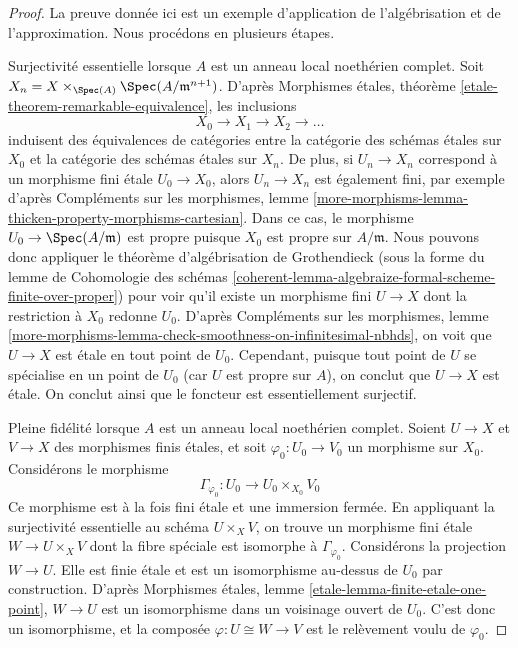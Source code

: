 \begin{proof}
La preuve donnée ici est un exemple d'application de l'algébrisation et de
l'approximation. Nous procédons en plusieurs étapes.

\medskip\noindent
Surjectivité essentielle lorsque $A$ est un anneau local noethérien complet.
Soit $X_n = X \times_{\Spec(A)} \Spec(A/\mathfrak m^{n + 1})$.
D'après Morphismes étales, théorème \ref{etale-theorem-remarkable-equivalence},
les inclusions
$$
X_0 \to X_1 \to X_2 \to \ldots
$$
induisent des équivalences de catégories entre la catégorie
des schémas étales sur $X_0$ et la catégorie des schémas
étales sur $X_n$.
De plus, si $U_n \to X_n$ correspond à un morphisme fini étale
$U_0 \to X_0$, alors $U_n \to X_n$ est également fini, par exemple
d'après Compléments sur les morphismes, lemme
\ref{more-morphisms-lemma-thicken-property-morphisms-cartesian}.
Dans ce cas, le morphisme $U_0 \to \Spec(A/\mathfrak m)$
est propre puisque $X_0$ est propre sur $A/\mathfrak m$. Nous pouvons donc appliquer
le théorème d'algébrisation de Grothendieck
(sous la forme du
lemme de Cohomologie des schémas
\ref{coherent-lemma-algebraize-formal-scheme-finite-over-proper})
pour voir qu'il existe un morphisme fini $U \to X$ dont la restriction
à $X_0$ redonne $U_0$. D'après Compléments sur les morphismes, lemme
\ref{more-morphisms-lemma-check-smoothness-on-infinitesimal-nbhds},
on voit que $U \to X$ est étale en tout point de $U_0$.
Cependant, puisque tout point de $U$ se spécialise en un point de $U_0$
(car $U$ est propre sur $A$), on conclut que $U \to X$ est étale.
On conclut ainsi que le foncteur est essentiellement surjectif.

\medskip\noindent
Pleine fidélité lorsque $A$ est un anneau local noethérien complet.
Soient $U \to X$ et $V \to X$ des morphismes finis étales, et
soit $\varphi_0 : U_0 \to V_0$ un morphisme sur $X_0$. Considérons
le morphisme
$$
\Gamma_{\varphi_0} : U_0 \longrightarrow U_0 \times_{X_0} V_0
$$
Ce morphisme est à la fois fini étale et une immersion fermée.
En appliquant la surjectivité essentielle au schéma $U \times_X V$, on trouve
un morphisme fini étale $W \to U \times_X V$ dont la fibre spéciale
est isomorphe à $\Gamma_{\varphi_0}$. Considérons la projection
$W \to U$. Elle est finie étale et est un isomorphisme au-dessus de $U_0$ par
construction. D'après Morphismes étales, lemme
\ref{etale-lemma-finite-etale-one-point},
$W \to U$ est un isomorphisme dans un voisinage ouvert de $U_0$.
C'est donc un isomorphisme, et la composée $\varphi : U \cong W \to V$
est le relèvement voulu de $\varphi_0$.


\end{proof}
